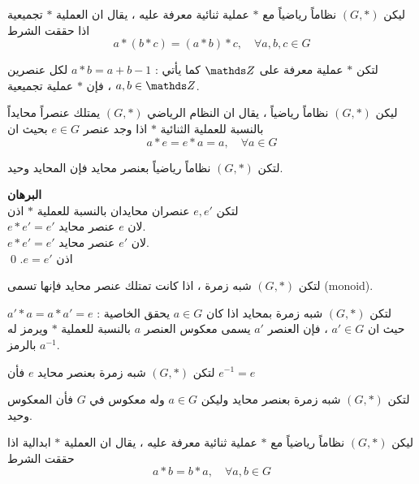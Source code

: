 \begin{definition}[]
	ليكن $(G, *)$ نظاماً رياضياً مع $*$ عملية ثنائية معرفة عليه ، يقال ان العملية $*$ تجميعية اذا حققت الشرط
	\[
	a*(b*c) = (a*b)*c,\quad \forall a,b,c\in G
	\]
\end{definition}



\begin{example}
	لتكن $*$ عملية معرفة على $\Z$ كما يأتي : $a*b =a+b-1$ لكل عنصرين $a, b\in \Z$ ، فإن $*$ عملية تجميعية.
\end{example}

\begin{definition}[]
	ليكن $(G, *)$ نظاماً رياضياً ، يقال ان النظام الرياضي $(G, *)$ يمتلك عنصراً محايداً بالنسبة للعملية الثنائية $*$ اذا وجد عنصر $e \in G$ بحيث ان
	\[
	a * e = e*a = a,\quad \forall a\in G
	\]
\end{definition}

\begin{theorem}
	لتكن $(G, *)$ نظاماً رياضياً بعنصر محايد فإن المحايد وحيد.
\end{theorem}
\noindent
\textbf{البرهان}\\
\noindent
لتكن $e, e'$ عنصران محايدان بالنسبة للعملية $*$ اذن\\
$e*e' =e'$ لان $e$ عنصر محايد.\\
$e*e' =e'$ لان $e'$ عنصر محايد.\\
اذن $e=e'$. \qed

\begin{definition}
	لتكن $(G, *)$ شبه زمرة ، اذا كانت تمتلك عنصر محايد فإنها تسمى (monoid).
\end{definition}

\begin{definition}[]
	لتكن $(G, *)$ شبه زمرة بمحايد اذا كان $a\in G$ يحقق الخاصية : $a'*a=a*a'=e$ حيث ان $a'\in G$ ، فإن العنصر $a'$ يسمى معكوس العنصر $a$ بالنسبة للعملية $*$ ويرمز له بالرمز $a^{-1}$.
\end{definition}

\begin{note}
	لتكن $(G, *)$ شبه زمرة بعنصر محايد $e$ فأن $e^{-1}=e$
\end{note}

\begin{theorem}
	لتكن $(G, *)$ شبه زمرة بعنصر محايد وليكن $a\in G$ وله معكوس في $G$ فأن المعكوس وحيد.
\end{theorem}

\begin{definition}[]
	ليكن $(G, *)$ نظاماً رياضياً مع $*$ عملية ثنائية معرفة عليه ، يقال ان العملية $*$ ابدالية اذا حققت الشرط
	\[
	a*b = b*a,\quad \forall a,b\in G
	\]
\end{definition}

